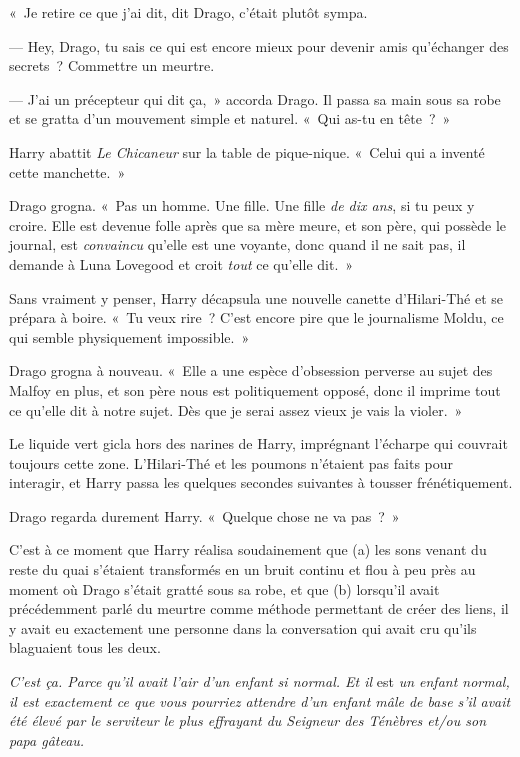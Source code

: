 «~Je retire ce que j'ai dit, dit Drago, c'était plutôt sympa.

--- Hey, Drago, tu sais ce qui est encore mieux pour devenir amis qu'échanger des secrets~? Commettre un meurtre.

--- J'ai un précepteur qui dit ça,~» accorda Drago. Il passa sa main sous sa robe et se gratta d'un mouvement simple et naturel. «~Qui as-tu en tête~?~»

Harry abattit \emph{Le Chicaneur} sur la table de pique-nique. «~Celui qui a inventé cette manchette.~»

Drago grogna. «~Pas un homme. Une fille. Une fille \emph{de dix ans}, si tu peux y croire. Elle est devenue folle après que sa mère meure, et son père, qui possède le journal, est \emph{convaincu} qu'elle est une voyante, donc quand il ne sait pas, il demande à Luna Lovegood et croit \emph{tout} ce qu'elle dit.~»

Sans vraiment y penser, Harry décapsula une nouvelle canette d'Hilari-Thé et se prépara à boire. «~Tu veux rire~? C'est encore pire que le journalisme Moldu, ce qui semble physiquement impossible.~»

Drago grogna à nouveau. «~Elle a une espèce d'obsession perverse au sujet des Malfoy en plus, et son père nous est politiquement opposé, donc il imprime tout ce qu'elle dit à notre sujet. Dès que je serai assez vieux je vais la violer.~»

Le liquide vert gicla hors des narines de Harry, imprégnant l'écharpe qui couvrait toujours cette zone. L'Hilari-Thé et les poumons n'étaient pas faits pour interagir, et Harry passa les quelques secondes suivantes à tousser frénétiquement.

Drago regarda durement Harry. «~Quelque chose ne va pas~?~»

C'est à ce moment que Harry réalisa soudainement que (a) les sons venant du reste du quai s'étaient transformés en un bruit continu et flou à peu près au moment où Drago s'était gratté sous sa robe, et que (b) lorsqu'il avait précédemment parlé du meurtre comme méthode permettant de créer des liens, il y avait eu exactement une personne dans la conversation qui avait cru qu'ils blaguaient tous les deux.

\emph{C'est ça. Parce qu'il avait l'air d'un enfant si normal. Et il} est \emph{un enfant normal, il est exactement ce que vous pourriez attendre d'un enfant mâle de base s'il avait été élevé par le serviteur le plus effrayant du Seigneur des Ténèbres et/ou son papa gâteau.}

